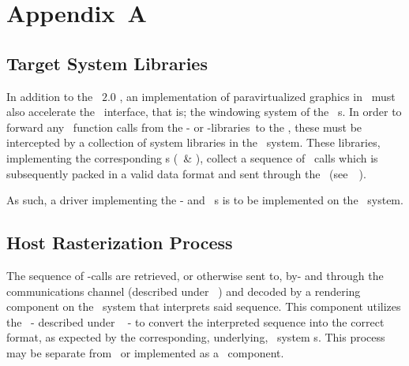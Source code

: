 
\chapter*{Appendix~A}
\label{cha:appendixa}

\section*{Target System Libraries}
\label{sec:appendixa_guestsystemlibraries}

In addition to the \termopengles ~$2.0$ \termapi , an implementation of paravirtualized graphics in \termsimics\ must also accelerate the \termegl\ interface, that is; the windowing system of the \termopengl\ \termapi s.
In order to forward any \termapi\ function calls from the \termopengles - or \termegl-libraries\ to the \termhost, these must be intercepted by a collection of system libraries in the \termtarget\ system.
These libraries, implementing the corresponding \termabi s (\termopengles\ \& \termegl), collect a sequence of \termapi\ calls which is subsequently packed in a valid data format and sent through the \termsimicspipe\ (see~\termsec ~).

As such, a driver implementing the \termopengl - and \termegl\ \termabi s is to be implemented on the \termtarget\ system.

\section*{Host Rasterization Process}
\label{sec:appendixa_hostrastterizationprocess}

The sequence of \termapi -calls are retrieved, or otherwise sent to, by- and through the communications channel (described under \termsec ~) and decoded by a rendering component on the \termhost\ system that interprets said sequence.
This component utilizes the \termhosttranslatorlibraries\ - described under \termsec ~ - to convert the interpreted sequence into the correct format, as expected by the corresponding, underlying, \termhost\ system \termabi s.
This process may be separate from \termsimics\ or implemented as a \termsimics ~component.

